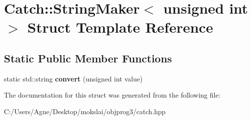 \hypertarget{struct_catch_1_1_string_maker_3_01unsigned_01int_01_4}{}\section{Catch\+:\+:String\+Maker$<$ unsigned int $>$ Struct Template Reference}
\label{struct_catch_1_1_string_maker_3_01unsigned_01int_01_4}
\subsection*{Static Public Member Functions}
\begin{DoxyCompactItemize}
\item 
\mbox{\label{struct_catch_1_1_string_maker_3_01unsigned_01int_01_4_aa0ec816ef8a65664b0524d55d08e2fd9}} 
static std\+::string {\bfseries convert} (unsigned int value)
\end{DoxyCompactItemize}


The documentation for this struct was generated from the following file\+:\begin{DoxyCompactItemize}
\item 
C\+:/\+Users/\+Agne/\+Desktop/mokslai/objprog3/catch.\+hpp\end{DoxyCompactItemize}
